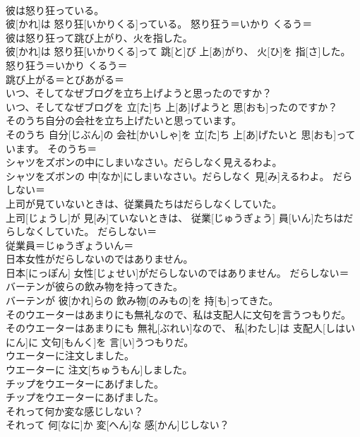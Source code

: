 \documentclass[8pt]{extreport}
\begin{document}
\begin{CJK}{UTF8}{min}
\\	彼は怒り狂っている。	
\\	彼[かれ]は 怒り狂[いかりくる]っている。	怒り狂う＝いかり くるう＝ 
\\	彼は怒り狂って跳び上がり、火を指した。	
\\	彼[かれ]は 怒り狂[いかりくる]って 跳[と]び 上[あ]がり、 火[ひ]を 指[さ]した。	怒り狂う＝いかり くるう＝ 
\\	跳び上がる＝とびあがる＝ 
\\	いつ、そしてなぜブログを立ち上げようと思ったのですか？	
\\	いつ、そしてなぜブログを 立[た]ち 上[あ]げようと 思[おも]ったのですか？	
\\	そのうち自分の会社を立ち上げたいと思っています。	
\\	そのうち 自分[じぶん]の 会社[かいしゃ]を 立[た]ち 上[あ]げたいと 思[おも]っています。	そのうち＝ 
\\	シャツをズボンの中にしまいなさい。だらしなく見えるわよ。	
\\	シャツをズボンの 中[なか]にしまいなさい。だらしなく 見[み]えるわよ。	だらしない＝ 
\\	上司が見ていないときは、従業員たちはだらしなくしていた。	
\\	上司[じょうし]が 見[み]ていないときは、 従業[じゅうぎょう] 員[いん]たちはだらしなくしていた。	だらしない＝ 
\\	従業員＝じゅうぎょういん＝ 
\\	日本女性がだらしないのではありません。	
\\	日本[にっぽん] 女性[じょせい]がだらしないのではありません。	だらしない＝ 
\\	バーテンが彼らの飲み物を持ってきた。	
\\	バーテンが 彼[かれ]らの 飲み物[のみもの]を 持[も]ってきた。	
\\	そのウエーターはあまりにも無礼なので、私は支配人に文句を言うつもりだ。	
\\	そのウエーターはあまりにも 無礼[ぶれい]なので、 私[わたし]は 支配人[しはいにん]に 文句[もんく]を 言[い]うつもりだ。	
\\	ウエーターに注文しました。	
\\	ウエーターに 注文[ちゅうもん]しました。	
\\	チップをウエーターにあげました。	
\\	チップをウエーターにあげました。	
\\	それって何か変な感じしない？	
\\	それって 何[なに]か 変[へん]な 感[かん]じしない？	

\end{CJK}
\end{document}
